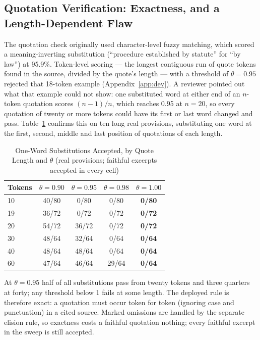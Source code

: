 \documentclass[conference]{IEEEtran}
\begin{document}
\subsection{Quotation Verification: Exactness, and a Length-Dependent Flaw}
\label{ssec:quotes}

The quotation check originally used character-level fuzzy matching, which scored a meaning-inverting substitution (``procedure established by statute'' for ``by law'') at 95.9\%. Token-level scoring --- the longest contiguous run of quote tokens found in the source, divided by the quote's length --- with a threshold of $\theta = 0.95$ rejected that 18-token example (Appendix~\ref{app:dev}). A reviewer pointed out what that example could not show: one substituted word at either end of an $n$-token quotation scores $(n-1)/n$, which reaches 0.95 at $n = 20$, so every quotation of twenty or more tokens could have its first or last word changed and pass. Table~\ref{tab:qsweep} confirms this on ten long real provisions, substituting one word at the first, second, middle and last position of quotations of each length.

\begin{table}[t]
\caption{One-Word Substitutions Accepted, by Quote Length and $\theta$ (real provisions; faithful excerpts accepted in every cell)}
\label{tab:qsweep}
\centering
\footnotesize
\begin{tabular}{@{}lcccc@{}}
\toprule
\textbf{Tokens} & $\theta{=}0.90$ & $\theta{=}0.95$ & $\theta{=}0.98$ & $\theta{=}1.00$ \\
\midrule
10 & 40/80 & 0/80  & 0/80  & \textbf{0/80} \\
19 & 36/72 & 0/72  & 0/72  & \textbf{0/72} \\
20 & 54/72 & 36/72 & 0/72  & \textbf{0/72} \\
30 & 48/64 & 32/64 & 0/64  & \textbf{0/64} \\
40 & 48/64 & 48/64 & 0/64  & \textbf{0/64} \\
60 & 47/64 & 46/64 & 29/64 & \textbf{0/64} \\
\bottomrule
\end{tabular}
\end{table}

At $\theta = 0.95$ half of all substitutions pass from twenty tokens and three quarters at forty; any threshold below 1 fails at some length. The deployed rule is therefore exact: a quotation must occur token for token (ignoring case and punctuation) in a cited source. Marked omissions are handled by the separate elision rule, so exactness costs a faithful quotation nothing; every faithful excerpt in the sweep is still accepted.
\end{document}
